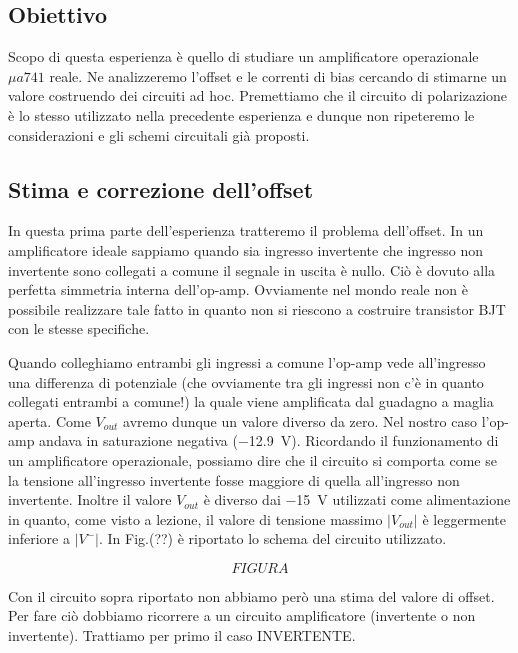 \subsection{Obiettivo}
Scopo di questa esperienza è quello di studiare un amplificatore operazionale $\mu a 741$ reale. Ne analizzeremo l'offset e le correnti di bias cercando di stimarne un valore costruendo dei circuiti ad hoc. Premettiamo che il circuito di polarizazione è lo stesso utilizzato nella precedente esperienza e dunque non ripeteremo le considerazioni e gli schemi circuitali già proposti. 



\subsection{Stima e correzione dell'offset}

In questa prima parte dell'esperienza tratteremo il problema dell'offset. In un amplificatore ideale sappiamo quando sia ingresso invertente che ingresso non invertente sono collegati a comune il segnale in uscita è nullo. Ciò è dovuto alla perfetta simmetria interna dell'op-amp. Ovviamente nel mondo reale non è possibile realizzare tale fatto in quanto non si riescono a costruire transistor BJT con le stesse specifiche. 

Quando colleghiamo entrambi gli ingressi a comune l'op-amp vede all'ingresso una differenza di potenziale (che ovviamente tra gli ingressi non c'è in quanto collegati entrambi a comune!) la quale viene amplificata dal guadagno a maglia aperta. Come $V_{out}$ avremo dunque un valore diverso da zero. Nel nostro caso l'op-amp andava in saturazione negativa (\SI{-12.9}{\volt}). Ricordando il funzionamento di un amplificatore operazionale, possiamo dire che il circuito si comporta come se la tensione all'ingresso invertente fosse maggiore di quella all'ingresso non invertente. Inoltre il valore $V_{out}$ è diverso dai \SI{-15}{\volt} utilizzati come alimentazione in quanto, come visto a lezione, il valore di tensione massimo $|V_{out}|$ è leggermente inferiore a $|V^-|$. In Fig.(??) è riportato lo schema del circuito utilizzato.


$$FIGURA$$



Con il circuito sopra riportato non abbiamo però una stima del valore di offset. Per fare ciò dobbiamo ricorrere a un circuito amplificatore (invertente o non invertente). Trattiamo per primo il caso INVERTENTE. 


















